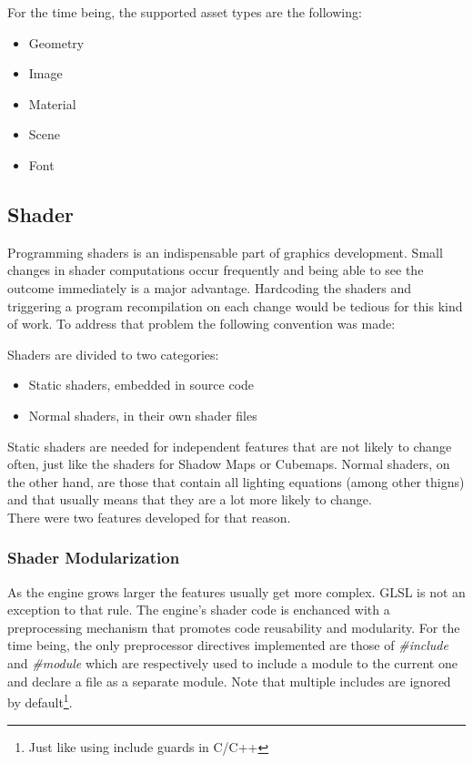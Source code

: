 \noindent For the time being, the supported asset types are the following:

\begin{itemize}
\item Geometry
\item Image
\item Material
\item Scene
\item Font
\end{itemize}

\subsection{Shader}
Programming shaders is an indispensable part of graphics development. Small changes in shader
computations occur frequently and being able to see the outcome immediately is a major
advantage. Hardcoding the shaders and triggering a program recompilation on each change would
be tedious for this kind of work. To address that problem the following convention was made:

\noindent Shaders are divided to two categories:

\begin{itemize}
\item Static shaders, embedded in source code
\item Normal shaders, in their own shader files
\end{itemize}

\noindent Static shaders are needed for independent features that are not likely to change often,
just like the shaders for Shadow Maps or Cubemaps. Normal shaders, on the other hand, are those
that contain all lighting equations (among other thigns) and that usually means that they are a
lot more likely to change.\\
There were two features developed for that reason.

\subsubsection{Shader Modularization}
As the engine grows larger the features usually get more complex. GLSL is not an exception to that
rule. The engine's shader code is enchanced with a preprocessing mechanism that promotes code reusability
and modularity. For the time being, the only preprocessor directives implemented are those of
\textit{\#include} and \textit{\#module} which are respectively used to include a module to the
current one and declare a file as a separate module. Note that multiple includes are ignored by
default\footnote{Just like using include guards in C/C++}.

